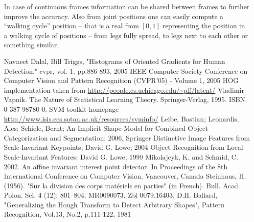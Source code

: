 \documentclass[a4paper]{article}
\begin{document}
In case of continuous frames information can be shared between frames to
further improve the accuracy. Also from joint positions one can easily compute
a ``walking cycle'' position -- that is a real from $ [0, 1] $ representing the
position in a walking cycle of positions -- from legs fully spread, to legs
next to each other or something similar.

\begin{thebibliography}{99}
   Navneet Dalal, Bill Triggs, "Histograms of Oriented Gradients for Human Detection," cvpr, vol. 1, pp.886-893, 2005 IEEE Computer Society Conference on Computer Vision and Pattern Recognition (CVPR'05) - Volume 1, 2005
   HOG implementation taken from \url{http://people.cs.uchicago.edu/~pff/latent/}
   Vladimir Vapnik. The Nature of Statistical Learning Theory. Springer-Verlag, 1995. ISBN 0-387-98780-0.
   SVM toolkit homepage \url{http://www.isis.ecs.soton.ac.uk/resources/svminfo/}
   Leibe, Bastian; Leonardis, Ales; Schiele, Bernt; An Implicit
                Shape Model for Combined Object Categorization and
                Segmentation; 2006, Springer
   Distinctive Image Features from Scale-Invariant Keypoints; David G. Lowe; 2004
   Object Recognition from Local Scale-Invariant Features; David G. Lowe; 1999
   Mikolajcyk, K. and Schmid, C. 2002. An affine invariant
                    interest point detector. In Proceedings of the 8th
                    International Conference on Computer Vision, Vancouver,
                    Canada
   Steinhaus, H. (1956). "Sur la division des corps matériels
                   en parties" (in French). Bull. Acad. Polon. Sci. 4 (12):
                   801–804. MR0090073.  Zbl 0079.16403.
   D.H. Ballard, "Generalizing the Hough Transform to Detect
                  Arbitrary Shapes", Pattern Recognition, Vol.13, No.2,
                  p.111-122, 1981
\end{thebibliography}
\end{document}
